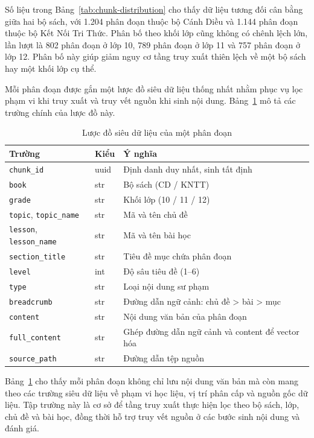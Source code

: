 \documentclass[../DoAn.tex]{subfiles}
\begin{document}
Số liệu trong Bảng~\ref{tab:chunk-distribution} cho thấy dữ liệu tương đối cân bằng giữa hai bộ sách, với 1.204 phân đoạn thuộc bộ Cánh Diều và 1.144 phân đoạn thuộc bộ Kết Nối Tri Thức. Phân bố theo khối lớp cũng không có chênh lệch lớn, lần lượt là 802 phân đoạn ở lớp 10, 789 phân đoạn ở lớp 11 và 757 phân đoạn ở lớp 12. Phân bố này giúp giảm nguy cơ tầng truy xuất thiên lệch về một bộ sách hay một khối lớp cụ thể.

Mỗi phân đoạn được gắn một lược đồ siêu dữ liệu thống nhất nhằm phục vụ lọc phạm vi khi truy xuất và truy vết nguồn khi sinh nội dung. Bảng~\ref{tab:chunk-metadata} mô tả các trường chính của lược đồ này.

\begin{table}[!htbp]
\centering
\small
\begin{tabular}{|l|l|l|}
\hline
\textbf{Trường} & \textbf{Kiểu} & \textbf{Ý nghĩa} \\
\hline
\texttt{chunk\_id} & uuid & Định danh duy nhất, sinh tất định \\
\texttt{book} & str & Bộ sách (CD / KNTT) \\
\texttt{grade} & str & Khối lớp (10 / 11 / 12) \\
\texttt{topic}, \texttt{topic\_name} & str & Mã và tên chủ đề \\
\texttt{lesson}, \texttt{lesson\_name} & str & Mã và tên bài học \\
\texttt{section\_title} & str & Tiêu đề mục chứa phân đoạn \\
\texttt{level} & int & Độ sâu tiêu đề (1--6) \\
\texttt{type} & str & Loại nội dung sư phạm \\
\texttt{breadcrumb} & str & Đường dẫn ngữ cảnh: chủ đề > bài > mục \\
\texttt{content} & str & Nội dung văn bản của phân đoạn \\
\texttt{full\_content} & str & Ghép đường dẫn ngữ cảnh và content để vector hóa \\
\texttt{source\_path} & str & Đường dẫn tệp nguồn \\
\hline
\end{tabular}
\caption{Lược đồ siêu dữ liệu của một phân đoạn}
\label{tab:chunk-metadata}
\end{table}

Bảng~\ref{tab:chunk-metadata} cho thấy mỗi phân đoạn không chỉ lưu nội dung văn bản mà còn mang theo các trường siêu dữ liệu về phạm vi học liệu, vị trí phân cấp và nguồn gốc dữ liệu. Tập trường này là cơ sở để tầng truy xuất thực hiện lọc theo bộ sách, lớp, chủ đề và bài học, đồng thời hỗ trợ truy vết nguồn ở các bước sinh nội dung và đánh giá.
\end{document}
